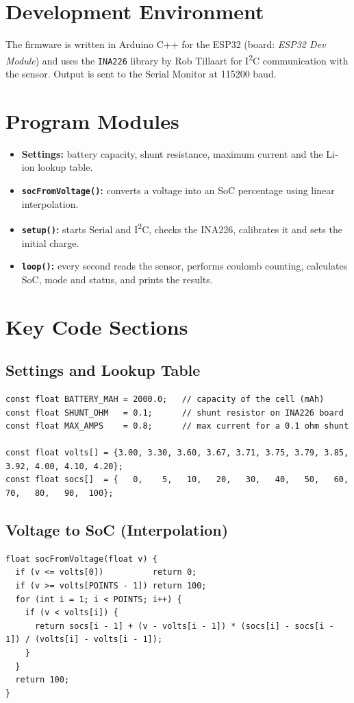 \documentclass[12pt,a4paper,oneside]{report}
\begin{document}
\section{Development Environment}
The firmware is written in Arduino C++ for the ESP32 (board: \emph{ESP32 Dev Module}) and uses the \texttt{INA226} library by Rob Tillaart for I\textsuperscript{2}C communication with the sensor. Output is sent to the Serial Monitor at 115200 baud.

\section{Program Modules}
\begin{itemize}
  \item \textbf{Settings:} battery capacity, shunt resistance, maximum current and the Li-ion lookup table.
  \item \textbf{\texttt{socFromVoltage()}:} converts a voltage into an SoC percentage using linear interpolation.
  \item \textbf{\texttt{setup()}:} starts Serial and I\textsuperscript{2}C, checks the INA226, calibrates it and sets the initial charge.
  \item \textbf{\texttt{loop()}:} every second reads the sensor, performs coulomb counting, calculates SoC, mode and status, and prints the results.
\end{itemize}

\section{Key Code Sections}

\subsection{Settings and Lookup Table}
\begin{lstlisting}
const float BATTERY_MAH = 2000.0;   // capacity of the cell (mAh)
const float SHUNT_OHM   = 0.1;      // shunt resistor on INA226 board
const float MAX_AMPS    = 0.8;      // max current for a 0.1 ohm shunt

const float volts[] = {3.00, 3.30, 3.60, 3.67, 3.71, 3.75, 3.79, 3.85, 3.92, 4.00, 4.10, 4.20};
const float socs[]  = {   0,    5,   10,   20,   30,   40,   50,   60,   70,   80,   90,  100};
\end{lstlisting}

\subsection{Voltage to SoC (Interpolation)}
\begin{lstlisting}
float socFromVoltage(float v) {
  if (v <= volts[0])          return 0;
  if (v >= volts[POINTS - 1]) return 100;
  for (int i = 1; i < POINTS; i++) {
    if (v < volts[i]) {
      return socs[i - 1] + (v - volts[i - 1]) * (socs[i] - socs[i - 1]) / (volts[i] - volts[i - 1]);
    }
  }
  return 100;
}
\end{lstlisting}
\end{document}
